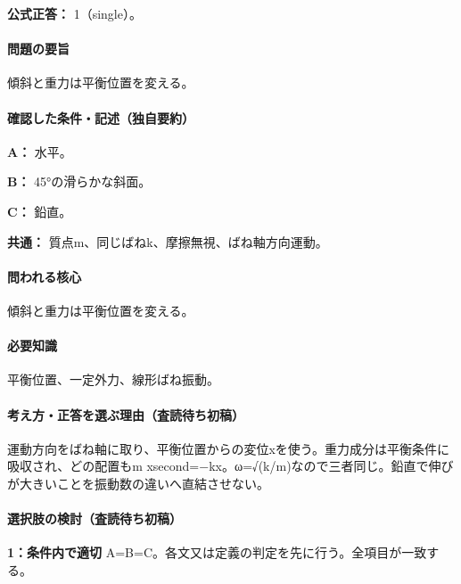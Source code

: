 \textbf{公式正答：} 1（single）。

\paragraph{問題の要旨} 傾斜と重力は平衡位置を変える。

\paragraph{確認した条件・記述（独自要約）}\mbox{}\par

\noindent\textbf{A：} 水平。\par

\noindent\textbf{B：} 45°の滑らかな斜面。\par

\noindent\textbf{C：} 鉛直。\par

\noindent\textbf{共通：} 質点m、同じばねk、摩擦無視、ばね軸方向運動。\par

\paragraph{問われる核心} 傾斜と重力は平衡位置を変える。

\paragraph{必要知識} 平衡位置、一定外力、線形ばね振動。

\paragraph{考え方・正答を選ぶ理由（査読待ち初稿）} 運動方向をばね軸に取り、平衡位置からの変位xを使う。重力成分は平衡条件に吸収され、どの配置もm xsecond=−kx。ω=√(k/m)なので三者同じ。鉛直で伸びが大きいことを振動数の違いへ直結させない。

\paragraph{選択肢の検討（査読待ち初稿）}\mbox{}\par

\noindent\textbf{1：条件内で適切} A=\allowbreak{}B=\allowbreak{}C。各文又は定義の判定を先に行う。全項目が一致する。\par

